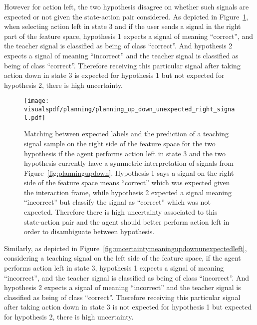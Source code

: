 However for action left, the two hypothesis disagree on whether such signals are expected or not given the state-action pair considered. As depicted in Figure~\ref{fig:uncertaintymeaningupdownunexpectedright}, when selecting action left in state 3 and if the user sends a signal in the right part of the feature space, hypothesis 1 expects a signal of meaning ``correct'', and the teacher signal is classified as being of class ``correct''. And hypothesis 2 expects a signal of meaning ``incorrect'' and the teacher signal is classified as being of class ``correct''. Therefore receiving this particular signal after taking action down in state 3 is expected for hypothesis 1 but not expected for hypothesis 2, there is high uncertainty.

\begin{figure}[!ht]
  \centering
  \texttt{[image: \\visualspdf/planning/planning\_up\_down\_unexpected\_right\_signal.pdf]}
  \caption{Matching between expected labels and the prediction of a teaching signal sample on the right side of the feature space for the two hypothesis if the agent performs action left in state 3 and the two hypothesis currently have a symmetric interpretation of signals from Figure~\ref{fig:planningupdown}. Hypothesis 1 says a signal on the right side of the feature space means ``correct'' which was expected given the interaction frame, while hypothesis 2 expected a signal meaning ``incorrect'' but classify the signal as ``correct'' which was not expected. Therefore there is high uncertainty associated to this state-action pair and the agent should better perform action left in order to disambiguate between hypothesis.}
  \label{fig:uncertaintymeaningupdownunexpectedright}
\end{figure}

Similarly, as depicted in Figure~\ref{fig:uncertaintymeaningupdownunexpectedleft}, considering a teaching signal on the left side of the feature space, if the agent performs action left in state 3, hypothesis 1 expects a signal of meaning ``incorrect'', and the teacher signal is classified as being of class ``incorrect''. And hypothesis 2 expects a signal of meaning ``incorrect'' and the teacher signal is classified as being of class ``correct''. Therefore receiving this particular signal after taking action down in state 3 is not expected for hypothesis 1 but expected for hypothesis 2, there is high uncertainty.

